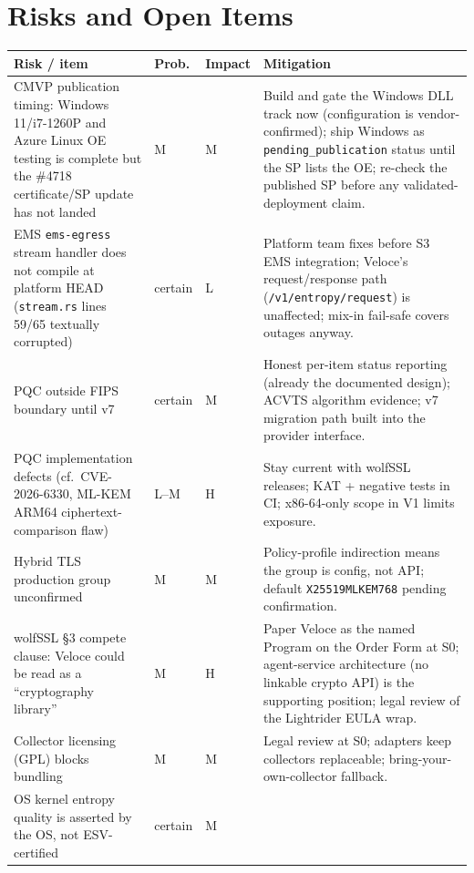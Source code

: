 \documentclass[10pt]{article}
\newcommand{\code}[1]{\texttt{\small #1}}
\begin{document}
\section{Risks and Open Items}\label{sec:risks}

\begin{small}
\begin{tabularx}{\textwidth}{@{}Lll L@{}}
\toprule
\textbf{Risk / item} & \textbf{Prob.} & \textbf{Impact} & \textbf{Mitigation} \\
\midrule
CMVP publication timing: Windows 11/i7-1260P and Azure Linux OE testing is complete but
  the \#4718 certificate/SP update has not landed & M & M & Build and gate the Windows
  DLL track now (configuration is vendor-confirmed); ship Windows as
  \code{pending\_publication} status until the SP lists the OE; re-check the published SP
  before any validated-deployment claim. \\
EMS \code{ems-egress} stream handler does not compile at platform HEAD
  (\code{stream.rs} lines 59/65 textually corrupted) & certain & L & Platform team fixes
  before S3 EMS integration; Veloce's request/response path
  (\code{/v1/entropy/request}) is unaffected; mix-in fail-safe covers outages anyway. \\
PQC outside FIPS boundary until v7 & certain & M & Honest per-item status reporting
  (already the documented design); ACVTS algorithm evidence; v7 migration path built into
  the provider interface. \\
PQC implementation defects (cf.\ CVE-2026-6330, ML-KEM ARM64 ciphertext-comparison flaw)
  & L--M & H & Stay current with wolfSSL releases; KAT + negative tests in CI; x86-64-only
  scope in V1 limits exposure. \\
Hybrid TLS production group unconfirmed & M & M & Policy-profile indirection means the
  group is config, not API; default \code{X25519MLKEM768} pending confirmation. \\
wolfSSL \S3 compete clause: Veloce could be read as a ``cryptography library'' & M & H &
  Paper Veloce as the named Program on the Order Form at S0; agent-service architecture
  (no linkable crypto API) is the supporting position; legal review of the Lightrider
  EULA wrap. \\
Collector licensing (GPL) blocks bundling & M & M & Legal review at S0; adapters keep
  collectors replaceable; bring-your-own-collector fallback. \\
OS kernel entropy quality is asserted by the OS, not ESV-certified & certain & M &

\end{tabularx}
\end{small}
\end{document}
